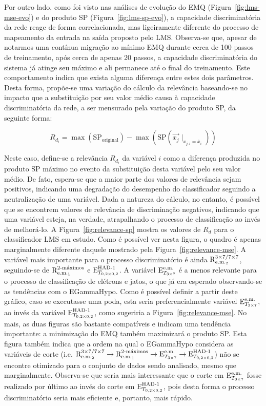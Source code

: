 Por outro lado, como foi visto nas análises de evolução do EMQ
(Figura~\ref{fig:lms-mse-evo}) e do produto SP (Figura~\ref{fig:lms-sp-evo}),
a capacidade discriminatória da rede reage de forma correlacionada, mas
ligeiramente diferente do processo de mapeamento da entrada na saída proposto
pelo LMS. Observa-se que, apesar de notarmos uma contínua migração ao mínimo
EMQ durante cerca de 100 passos de treinamento, após cerca de apenas 20
passos, a capacidade discriminatória do sistema já atinge seu máximo e ali
permanece até o final do treinamento. Este comportamento indica que exista
alguma diferença entre estes dois parâmetros. Desta forma, propõe-se uma
variação do cálculo da relevância baseando-se no impacto que a substituição
por seu valor médio causa à capacidade discriminatória da rede, a ser
mensurado pela variação do produto SP, da seguinte forma:

\begin{equation}
R_{d_i} = \max(\text{SP}_{\text{original}}) - \max(\text{SP}(\overrightarrow{x_j}\mid_{x_{j,i} = \overline{x}_i}))
\label{eq:relevance-sp}
\end{equation}

Neste caso, define-se a relevância $R_{d_i}$ da variável $i$ como a diferença
produzida no produto SP máximo no evento da substituição desta variável pelo
seu valor médio. De fato, espera-se que a maior parte dos valores de
relevância sejam positivos, indicando uma degradação do desempenho do
classificador seguindo a neutralização de uma variável. Dada a natureza do
cálculo, no entanto, é possível que se encontrem valores de relevância de
discriminação negativos, indicando que uma variável esteja, na verdade,
atrapalhando o processo de classificação ao invés de melhorá-lo. A
Figura~\ref{fig:relevance-sp} mostra os valores de $R_d$ para o classificador
LMS em estudo. Como é possível ver nesta figura, o quadro é apenas
marginalmente diferente daquele mostrado pela
Figura~\ref{fig:relevance-mse}. A variável mais importante para o processo
discriminatório é ainda $\rcore$, seguindo-se de $\eratio$ e $\ethad$. A
variável $\etem$ é a menos relevante para o processo de classificação de
elétrons e jatos, o que já era esperado observando-se as tendências com o
EGammaHypo. Como é possível definir a partir deste gráfico, caso se executasse
uma poda, esta seria preferencialmente variável $\etem$, ao invés da variável
$\ethad$, como sugeriria a Figura~\ref{fig:relevance-mse}. No mais, as duas
figuras são bastante compatíveis e indicam uma tendência importante: a
minimização do EMQ também maximizará o produto SP. Esta figura também indica
que a ordem na qual o EGammaHypo considera as variáveis de corte (i.e. $\rcore
\rightarrow \eratio \rightarrow \etem \rightarrow \ethad$) não se encontre
otimizado para o conjunto de dados sendo analisado, mesmo que
marginalmente. Observa-se que seria mais interessante que o corte em $\etem$
fosse realizado por último ao invés do corte em $\ethad$, pois desta forma o
processo discriminatório seria mais eficiente e, portanto, mais rápido.

